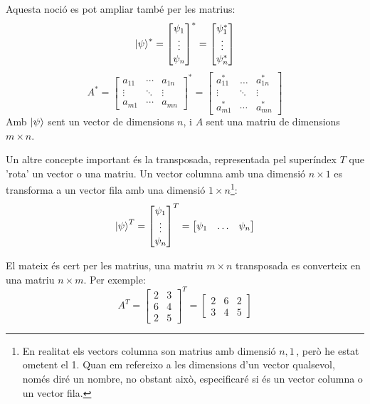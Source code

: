 Aquesta noció es pot ampliar també per les matrius:
$$
\ket{\psi}^{*} = 
	\begin{bmatrix} \psi_{1} \\ \vdots \\ \psi_{n} \end{bmatrix}^* = \begin{bmatrix} \psi_{1}^* \\ \vdots \\ \psi_{n}^* \end{bmatrix}
$$
$$
A^{*} = 
	\begin{bmatrix} 
	a_{11} & \cdots & a_{1n}\\ 
	\vdots & \ddots & \vdots \\ 
	a_{m1} & \cdots & a_{mn}
\end{bmatrix}^* 
= \begin{bmatrix} 
	a_{11}^* & \dots & a_{1n}^*\\ 
	\vdots & \ddots & \vdots \\ 
	a_{m1}^* & \cdots & a_{mn}^*
\end{bmatrix}
$$
Amb $\ket{\psi}$ sent un vector de dimensions $n$, i $A$ sent una matriu de dimensions $m \times n$.

Un altre concepte important és la transposada, representada pel superíndex $T$ que 'rota' un vector o una matriu. Un vector columna amb una dimensió $n\times 1$ es transforma a un vector fila amb una dimensió $1\times n$\footnote{En realitat els vectors columna son matrius amb dimensió $n,1\,$, però he estat ometent el 1. Quan em refereixo a les dimensions d'un vector qualsevol, només diré un nombre, no obstant això, especificaré si és un vector columna o un vector fila.}:
$$
\ket{\psi}^{T} = 
	\begin{bmatrix} \psi_{1} \\ \vdots \\ \psi_{n} \end{bmatrix}^T = \begin{bmatrix} \psi_{1} & \dots & \psi_{n} \end{bmatrix}
$$

El mateix és cert per les matrius, una matriu $m\times n$ transposada es converteix en una matriu $n \times m$. Per exemple:
$$
A^T = \begin{bmatrix}
	 2 & 3 \\
	 6 & 4 \\
	 2 & 5 
\end{bmatrix}^T = \begin{bmatrix}
 2 & 6 & 2 \\
 3 & 4 & 5
\end{bmatrix}
$$

